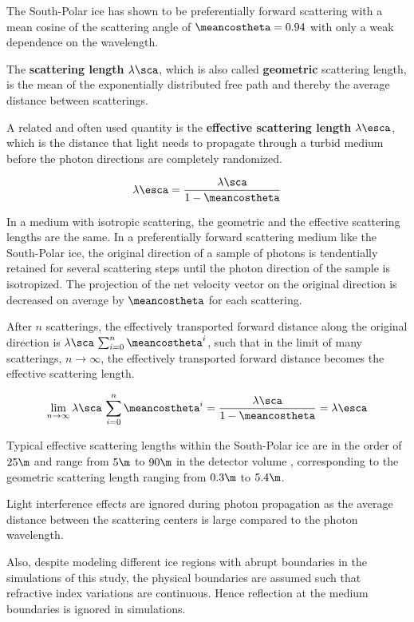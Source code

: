 The South-Polar ice has shown to be preferentially forward scattering with a mean cosine of the scattering angle of $\meancostheta = 0.94$ with only a weak dependence on the wavelength. \cite{ackermann}

The \textbf{scattering length} $\lambda\sca$, which is also called \textbf{geometric} scattering length, is the mean of the exponentially distributed free path and thereby the average distance between scatterings. \cite{ackermann}

A related and often used quantity is the \textbf{effective scattering length} $\lambda\esca$, which is the distance that light needs to propagate through a turbid medium before the photon directions are completely randomized. \cite{lundberg}

\begin{equation}
  \lambda\esca = \frac{\lambda\sca}{1 - \meancostheta}
\end{equation}

In a medium with isotropic scattering, the geometric and the effective scattering lengths are the same. In a preferentially forward scattering medium like the South-Polar ice, the original direction of a sample of photons is tendentially retained for several scattering steps until the photon direction of the sample is isotropized. The projection of the net velocity vector on the original direction is decreased on average by $\meancostheta$ for each scattering. \cite{lundberg}

After $n$ scatterings, the effectively transported forward distance along the original direction is $\lambda\sca\,\sum_{i=0}^n \meancostheta^i$, such that in the limit of many scatterings, $n \rightarrow \infty$, the effectively transported forward distance becomes the effective scattering length. \cite{lundberg, ackermann}

$$ \lim_{n \rightarrow \infty} \lambda\sca\,\sum_{i=0}^n \meancostheta^i = \frac{\lambda\sca}{1 - \meancostheta} = \lambda\esca $$


Typical effective scattering lengths within the South-Polar ice are in the order of $25\m$ \cite{lundberg} and range from $5\m$ to $90\m$ in the detector volume \cite{icepaper}, corresponding to the geometric scattering length ranging from $0.3\m$ to $5.4\m$.

Light interference effects are ignored during photon propagation as the average distance between the scattering centers is large compared to the photon wavelength. \cite{ackermann}

Also, despite modeling different ice regions with abrupt boundaries in the simulations of this study, the physical boundaries are assumed such that refractive index variations are continuous. Hence reflection at the medium boundaries is ignored in simulations. \cite{lundberg}
